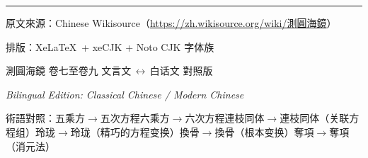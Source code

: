 \documentclass[11pt,a4paper]{article}
\newcommand{\longline}{\noindent\rule{\textwidth}{0.4pt}}
\begin{document}
\vspace{1cm}

\begin{center}
\longline

\vspace{0.5cm}

{\small\tradfont 原文來源：Chinese Wikisource（\url{https://zh.wikisource.org/wiki/測圓海鏡}）}

\vspace{0.2cm}

{\small\modfont 排版：Xe\LaTeX\ + xeCJK + Noto CJK 字体族}

\vspace{0.2cm}

{\small 測圓海鏡 卷七至卷九 \quad 文言文\,$\boldsymbol{\leftrightarrow}$\,白话文 對照版}

{\small \textit{Bilingual Edition: Classical Chinese / Modern Chinese}}

\vspace{0.3cm}

{\footnotesize 術語對照：五乘方$\to$五次方程\quad 六乘方$\to$六次方程\quad 連枝同体$\to$連枝同体（关联方程组）\quad 玲珑$\to$玲珑（精巧的方程变换）\quad 換骨$\to$換骨（根本变换）\quad 奪項$\to$奪項（消元法）}
\end{center}
\end{document}
